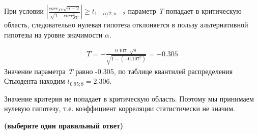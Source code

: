 \documentclass[12pt, table, twoside, a4paper]{exam}
\begin{document}
\begin{questions}
\begin{subparts}
\begin{solution}[6em]
		При условии $\left|\frac{corr_{XY}\sqrt{n-2}}{\sqrt{1-corr_{XY}^2}}\right|\geq t_{1-\alpha/2;n-2}$ параметр \textit{T} попадает в критическую область, следовательно нулевая гипотеза отклоняется в пользу альтернативной гипотезы на уровне значимости $\alpha$.
		
		\begin{align*}
			T=-\frac{0.107 \cdot \sqrt{8}}{\sqrt{1-\left(-0.107^2\right)}}=-0.305
		\end{align*}
		Значение параметра \textit{T} равно -0.305, по таблице квантилей распределения Стьюдента находим $t_{0.95;8}=2.306$.
		
		Значение критерия не попадает в критическую область. Поэтому мы принимаем нулевую гипотезу, т.е. коэффициент корреляции статистически не значим.
		
	\end{solution}
	
\end{subparts}
\addpoints

\end{questions}

\pagebreak
\noindent\textbf{(выберите один правильный ответ)}
\end{document}
